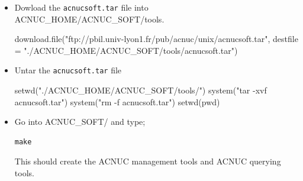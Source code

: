 \documentclass{article}
\begin{document}
\begin{itemize}
\item Dowload the \texttt{acnucsoft.tar} file into ACNUC\_HOME/ACNUC\_SOFT/tools.

\begin{Schunk}
\begin{Sinput}
 download.file("ftp://pbil.univ-lyon1.fr/pub/acnuc/unix/acnucsoft.tar",
 destfile = "./ACNUC_HOME/ACNUC_SOFT/tools/acnucsoft.tar")
\end{Sinput}
\end{Schunk}


\item Untar the \texttt{acnucsoft.tar} file 

\begin{Schunk}
\begin{Sinput}
 setwd("./ACNUC_HOME/ACNUC_SOFT/tools/")
 system("tar -xvf acnucsoft.tar")
 system("rm -f acnucsoft.tar")
 setwd(pwd)
\end{Sinput}
\end{Schunk}




\item Go into ACNUC\_SOFT/ and type;
\begin{verbatim}
make
\end{verbatim}
This should create the ACNUC management tools and ACNUC querying tools.


\end{itemize}
\end{document}
